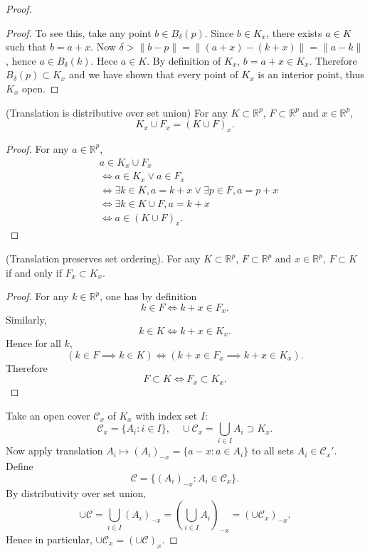 \begin{enumerate}
\begin{proof}
\begin{lemma}
\begin{proof}
		To see this, take any point $b \in B_\delta(p)$. Since  $b \in K_x$, there exists $a \in K$ such that $b = a + x$. Now $\delta>\| b - p\| = \|(a + x)-(k+x)\| = \|a - k\|$, hence $a \in B_\delta(k)$. Hece $a \in K$. By definition of $K_x$, $b = a+x \in K_x$. Therefore $B_\delta(p) \subset K_x$ and we have shown that every point of $K_x$ is an interior point, thus $K_x$ open.
	\end{proof}
\end{lemma}

\begin{lemma}(Translation is distributive over set union)
		For any $K \subset \mathbb{R}^p$, $F\subset \mathbb{R}^p$ and $x \in \mathbb{R}^p$,\[
			K_x \cup F_x = (K \cup F)_x
		.\] 
	
	\begin{proof}
		For any $a \in \mathbb{R}^p$,
		\begin{align*}
			&a \in K_x \cup F_x \\
			&\iff a \in K_x \lor a \in F_x \\
			&\iff \exists k \in K, a = k + x \lor  \exists p \in F, a = p + x \\
			&\iff \exists k \in K \cup F, a = k + x \\
			&\iff a \in  (K \cup F)_x
		.\end{align*}
	\end{proof}
	\end{lemma}
\begin{lemma}(Translation preserves set ordering).
		For any $K \subset \mathbb{R}^p$, $F\subset \mathbb{R}^p$ and $x \in \mathbb{R}^p$, $F \subset K$ if and only if $F_x \subset K_x$.
	\begin{proof}
		For any $k \in \mathbb{R}^p$, one has by definition \[
			k \in F \iff k+x \in F_x
		.\] 
		Similarly, \[
			k \in K \iff  k + x \in K_x
		.\] 
		Hence for all $k$, \[
			(k \in F \implies k \in K)
			\iff 
			(k + x \in F_x \implies k+x \in K_x)
		.\] 
		Therefore
		\[
			F\subset K \iff  F_x \subset K_x
		.\] 
	\end{proof}
	\end{lemma}
	Take an open cover $\mathcal{C}_x$ of $K_x$ with index set $I$:  \[
		\mathcal{C}_x = \{A_i: i \in I\} ,
		\quad
		\cup \mathcal{C}_x = \bigcup_{i \in I} A_i \supset K_x
	.\] 
	Now apply translation $A_i \mapsto (A_i)_{-x} = \{a-x: a \in A_i\} $ to all sets $A_i \in \mathcal{C}_x'$. Define
	\[
		\mathcal{C} = \{(A_i)_{-x}: A_i \in \mathcal{C}_x\} 
	.\] 
	By distributivity over set union,
	\[
		\cup \mathcal{C} = \bigcup_{i \in  I} (A_i)_{-x} = \left( \bigcup_{i \in  I} A_i \right) _{-x} = \left( \cup \mathcal{C}_x \right) _{-x}
	.\]
	Hence in particular, $\cup \mathcal{C}_x = \left( \cup \mathcal{C} \right) _{x}$.
	 

\end{proof}
\end{enumerate}
